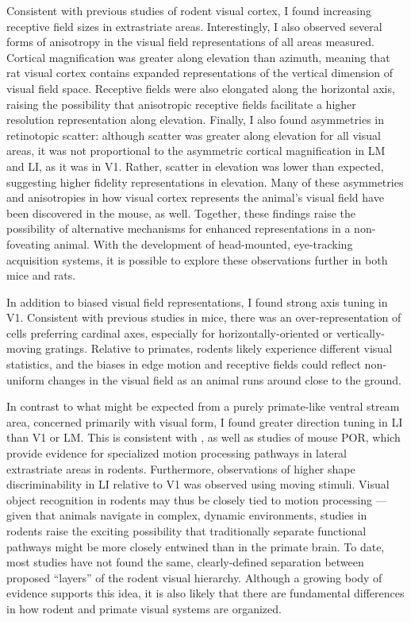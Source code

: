 Consistent with previous studies of rodent visual cortex, I found increasing receptive field sizes in extrastriate areas. Interestingly, I also observed several forms of anisotropy in the visual field representations of all areas measured. Cortical magnification was greater along elevation than azimuth, meaning that rat visual cortex contains expanded representations of the vertical dimension of visual field space. Receptive fields were also elongated along the horizontal axis, raising the possibility that anisotropic receptive fields facilitate a higher resolution representation along elevation. Finally, I also found asymmetries in retinotopic scatter: although scatter was greater along elevation for all visual areas, it was not proportional to the asymmetric cortical magnification in LM and LI, as it was in V1. Rather, scatter in elevation was lower than expected, suggesting higher fidelity representations in elevation. Many of these asymmetries and anisotropies in how visual cortex represents the animal's visual field have been discovered in the mouse, as well\cite{Marshel2011, Bonin2011, Juavinett2017,Zhuang2017,Murgas2020,Sit2020}. Together, these findings raise the possibility of alternative mechanisms for enhanced representations in a non-foveating animal. With the development of head-mounted, eye-tracking acquisition systems\cite{Meyer2020, Michaiel2020}, it is possible to explore these observations further in both mice and rats. 

In addition to biased visual field representations, I found strong axis tuning in V1. Consistent with previous studies in mice, there was an over-representation of cells preferring cardinal axes, especially for horizontally-oriented or vertically-moving gratings. Relative to primates, rodents likely experience different visual statistics, and the biases in edge motion and receptive fields could reflect non-uniform changes in the visual field as an animal runs around close to the ground. 

In contrast to what might be expected from a purely primate-like ventral stream area, concerned primarily with visual form, I found greater direction tuning in LI than V1 or LM. This is consistent with \citet{Vermaercke2014}, as well as studies of mouse POR, which provide evidence for specialized motion processing pathways in lateral extrastriate areas in rodents. Furthermore, observations of higher shape discriminability in LI relative to V1\cite{Vermaercke2014,Froudarakis2020} was observed using moving stimuli. Visual object recognition in rodents may thus be closely tied to motion processing --- given that animals navigate in complex, dynamic environments, studies in rodents raise the exciting possibility that traditionally separate functional pathways might be more closely entwined than in the primate brain. To date, most studies have not found the same, clearly-defined separation between proposed ``layers'' of the rodent visual hierarchy. Although a growing body of evidence supports this idea, it is also likely that there are fundamental differences in how rodent and primate visual systems are organized. 

